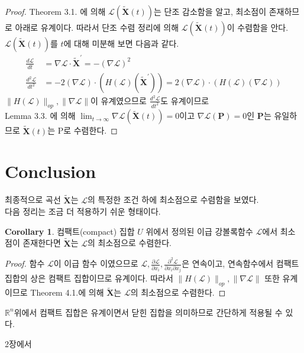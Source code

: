 \documentclass[a4paper,20pt]{article}
\theoremstyle{definition}
\newtheorem{corollary}{Corollary}[theorem]
\newcommand{\limit}[2][\infty]{\lim_{#2 \to #1}}
\newcommand{\curve}[1][X]{\tilde{\mathbf{#1}}}
\begin{document}
\begin{proof}
Theorem 3.1. 에 의해 $\mathcal{L}(\curve(t))$는 단조 감소함을 알고, 최소점이 존재하므로 아래로 유계이다. 따라서 단조 수렴 정리에 의해 $\mathcal{L}(\curve(t))$이 수렴함을 안다. $\mathcal{L}(\curve(t))$를 $t$에 대해 미분해 보면 다음과 같다.
\begin{align*}
\frac{d\mathcal{L}}{dt}&=\nabla\mathcal{L}\cdot\curve^{\prime} = -(\nabla\mathcal{L})^{2}\\
\frac{d^2\mathcal{L}}{dt^2}&=-2(\nabla\mathcal{L})\cdot(H(\mathcal{L})(\curve^{\prime}))=2(\nabla\mathcal{L})\cdot(H(\mathcal{L})(\nabla\mathcal{L}))
\end{align*}
$\|H(\mathcal{L})\|_{op}, \|\nabla\mathcal{L}\|$이 유계였으므로 $\frac{d^2\mathcal{L}}{dt^2}$도 유계이므로 
\\
Lemma 3.3. 에 의해 $\limit{t}\nabla\mathcal{L}(\curve(t))=0$이고 $\nabla\mathcal{L}(\mathbf{P})=0$인 $\mathbf{P}$는 유일하므로 $\curve(t)$는 P로 수렴한다.
\end{proof}


\section{Conclusion}

최종적으로 곡선 $\curve$는 $\mathcal{L}$의 특정한 조건 하에 최소점으로 수렴함을 보였다. \\
다음 정리는 조금 더 적용하기 쉬운 형태이다.

\begin{corollary}
컴팩트(compact) 집합 $U$ 위에서 정의된 이급 강볼록함수 $\mathcal{L}$에서 최소점이 존재한다면 $\curve$는 $\mathcal{L}$의 최소점으로 수렴한다.
\end{corollary}
\begin{proof}
함수 $\mathcal{L}$이 이급 함수 이였으므로 $\mathcal{L}, \frac{\partial\mathcal{L}}{\partial x_{i}}, \frac{\partial^{2}\mathcal{L}}{\partial x_{i}\partial x_{j}}$은 연속이고,
연속함수에서 컴팩트 집합의 상은 컴팩트 집합이므로 유계이다. 따라서 $\|H(\mathcal{L})\|_{op}, \|\nabla\mathcal{L}\|$ 또한 유계이므로 Theorem 4.1.에 의해 $\curve$는 $\mathcal{L}$의 최소점으로 수렴한다.
\end{proof}

$\mathbb{R}^{n}$위에서 컴팩트 집합은 유계이면서 닫힌 집합을 의미하므로 간단하게 적용될 수 있다.

2장에서 
\end{document}
